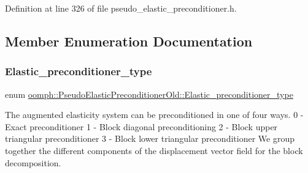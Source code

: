 Definition at line 326 of file pseudo\+\_\+elastic\+\_\+preconditioner.\+h.



\subsection{Member Enumeration Documentation}
\mbox{\label{classoomph_1_1PseudoElasticPreconditionerOld_a6748360e3e2fbd4766d837a520dadfd0}} 
\subsubsection{\texorpdfstring{Elastic\+\_\+preconditioner\+\_\+type}{Elastic\_preconditioner\_type}}
{\footnotesize\ttfamily enum \hyperlink{classoomph_1_1PseudoElasticPreconditionerOld_a6748360e3e2fbd4766d837a520dadfd0}{oomph\+::\+Pseudo\+Elastic\+Preconditioner\+Old\+::\+Elastic\+\_\+preconditioner\+\_\+type}}



The augmented elasticity system can be preconditioned in one of four ways. 0 -\/ Exact preconditioner 1 -\/ Block diagonal preconditioning 2 -\/ Block upper triangular preconditioner 3 -\/ Block lower triangular preconditioner We group together the different components of the displacement vector field for the block decomposition. 

